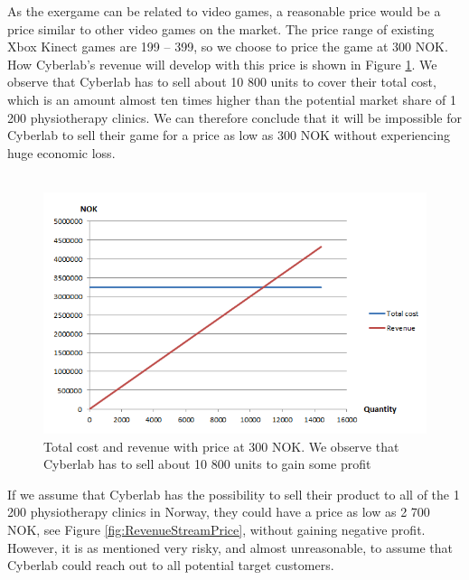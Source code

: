 As the exergame can be related to video games, a reasonable price would be a price similar to other video games on the market. The price range of existing Xbox Kinect games are 199 – 399, so we choose to price the game at 300 NOK. How Cyberlab’s revenue will develop with this price is shown in Figure \ref{fig:FixedLowPrice}. We observe that Cyberlab has to sell about 10 800 units to cover their total cost, which is an amount almost ten times higher than the potential market share of 1 200 physiotherapy clinics. We can therefore conclude that it will be impossible for Cyberlab to sell their game for a price as low as 300 NOK without experiencing huge economic loss.\\ \\
\begin{figure}
\begin{center}
\includegraphics[scale=0.7]{fixedlowprice}
\caption[Price related to commercial video games]{Total cost and revenue with price at 300 NOK. We observe that Cyberlab has to sell about 10 800 units to gain some profit}
\label{fig:FixedLowPrice}
\end{center}
\end{figure}
If we assume that Cyberlab has the possibility to sell their product to all of the 1 200 physiotherapy clinics in Norway, they could have a price as low as 2 700 NOK, see Figure \ref{fig:RevenueStreamPrice}, without gaining negative profit. However, it is as mentioned very risky, and almost unreasonable, to assume that Cyberlab could reach out to all potential target customers. \\ \\
